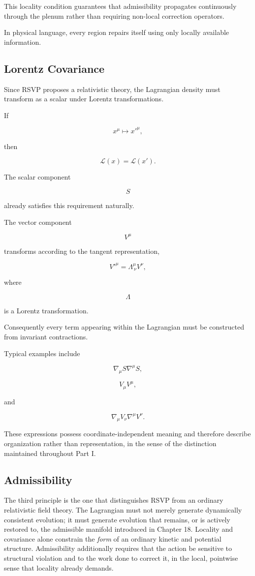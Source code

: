 \documentclass[11pt,oneside]{book}
\numberwithin{equation}{chapter}
\theoremstyle{definition}
\theoremstyle{plain}
\begin{document}
This locality condition guarantees that admissibility propagates
continuously through the plenum rather than requiring non-local correction
operators.

In physical language, every region repairs itself using only locally
available information.

\subsection*{Lorentz Covariance}

Since RSVP proposes a relativistic theory, the Lagrangian density must
transform as a scalar under Lorentz transformations.

If

\[
x^\mu
\mapsto
{x'}^\mu,
\]

then

\[
\mathcal L(x)
=
\mathcal L(x').
\]

The scalar component

\[
S
\]

already satisfies this requirement naturally.

The vector component

\[
V^\mu
\]

transforms according to the tangent representation,

\[
{V'}^\mu
=
\Lambda^\mu_{\ \nu}
V^\nu,
\]

where

\[
\Lambda
\]

is a Lorentz transformation.

Consequently every term appearing within the Lagrangian must be constructed
from invariant contractions.

Typical examples include

\[
\nabla_\mu S
\nabla^\mu S,
\]

\[
V_\mu V^\mu,
\]

and

\[
\nabla_\mu V_\nu
\nabla^\mu V^\nu.
\]

These expressions possess coordinate-independent meaning and therefore
describe organization rather than representation, in the sense of the
distinction maintained throughout Part I.

\subsection*{Admissibility}

The third principle is the one that distinguishes RSVP from an ordinary
relativistic field theory. The Lagrangian must not merely generate
dynamically consistent evolution; it must generate evolution that remains,
or is actively restored to, the admissible manifold introduced in Chapter
18. Locality and covariance alone constrain the \emph{form} of an
ordinary kinetic and potential structure. Admissibility additionally
requires that the action be sensitive to structural violation and to the
work done to correct it, in the local, pointwise sense that locality already
demands.
\end{document}
